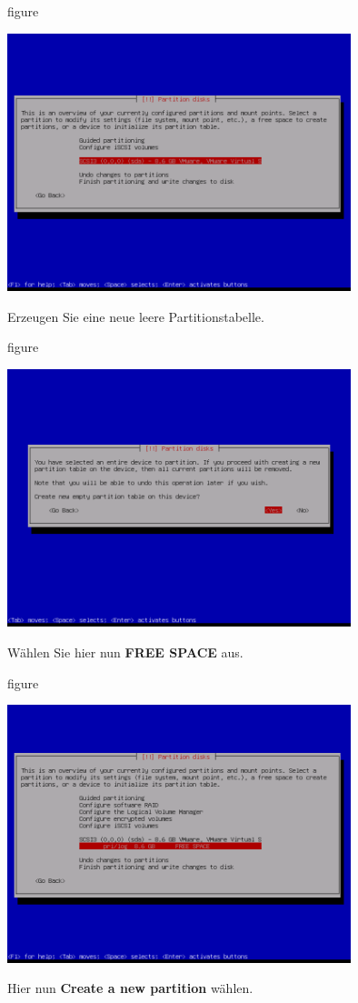 \begin{nofloat}{figure}
\begin{center}
\includegraphics[width=0.75\textwidth]{screenshots/12_ubuntu_install.png}
\end{center}
\end{nofloat}
\newpage
Erzeugen Sie eine neue leere Partitionstabelle.

\begin{nofloat}{figure}
\begin{center}
\includegraphics[width=0.75\textwidth]{screenshots/13_ubuntu_install.png}
\end{center}
\end{nofloat}

Wählen Sie hier nun \textbf{FREE SPACE} aus.

\begin{nofloat}{figure}
\begin{center}
\includegraphics[width=0.75\textwidth]{screenshots/14_ubuntu_install.png}
\end{center}
\end{nofloat}
\newpage
Hier nun \textbf{Create a new partition} wählen.

